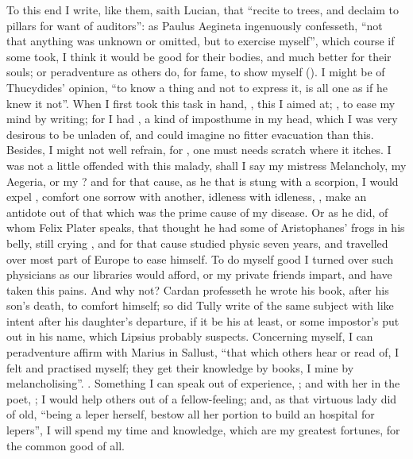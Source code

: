 To this end I write, like them, saith Lucian, that \enquote{recite to trees, and
declaim to pillars for want of auditors}: as Paulus Aegineta
ingenuously confesseth, \enquote{not that anything was unknown or omitted, but to
exercise myself}, which course if some took, I think it would be good for their
bodies, and much better for their souls; or peradventure as others do, for
fame, to show myself (). I might be of Thucydides' opinion, \enquote{to know a thing
and not to express it, is all one as if he knew it not}. When I first took this
task in hand, , this I aimed at; , to ease my mind by writing; for I had , a kind of imposthume in my head, which I was very desirous to be
unladen of, and could imagine no fitter evacuation than this. Besides, I might
not well refrain, for , one must needs scratch where
it itches. I was not a little offended with this malady, shall I say my
mistress Melancholy, my Aegeria, or my ? and for that cause,
as he that is stung with a scorpion, I would expel ,
comfort one sorrow with another, idleness with idleness,
, make an antidote out of that which was the prime
cause of my disease. Or as he did, of whom Felix Plater
speaks, that thought he had some of Aristophanes' frogs in his belly, still
crying , and for that cause studied
physic seven years, and travelled over most part of Europe to ease himself. To
do myself good I turned over such physicians as our libraries would afford, or
my private friends impart, and have taken this pains. And
why not? Cardan professeth he wrote his book,  after his son's death, to comfort himself; so did Tully write of
the same subject with like intent after his daughter's departure, if it be his
at least, or some impostor's put out in his name, which Lipsius probably
suspects. Concerning myself, I can peradventure affirm with Marius in Sallust,
\enquote{that which others hear or read of, I felt and practised
myself; they get their knowledge by books, I mine by melancholising}.
. Something I can speak out of experience,
; and with her in the poet,
; I would help others out of a fellow-feeling;
and, as that virtuous lady did of old, \enquote{being a leper
herself, bestow all her portion to build an hospital for lepers}, I will spend
my time and knowledge, which are my greatest fortunes, for the common good of
all.

